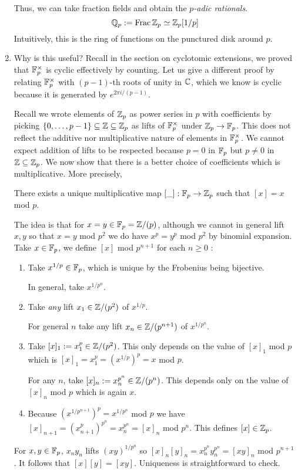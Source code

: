 \documentclass{article}
\begin{document}
\begin{enumerate}
  Thus, we can take fraction fields and obtain
  the \emph{$p$-adic rationals}.
  \[
    \mathbb{Q}_p := \mathrm{Frac}\,{\mathbb{Z}_p} \simeq \mathbb{Z}_p[1 / p]
  \]
  Intuitively, this is the ring of functions on the punctured disk around $p$.

  \item Why is this useful? 
  Recall in the section on cyclotomic extensions,
  we proved that $\mathbb{F}_p^\times$ is cyclic effectively by counting.
  Let us give a different proof by relating $\mathbb{F}_p^\times$
  with $(p-1)$-th roots of unity in $\mathbb{C}$, which we know is cyclic
  because it is generated by $e^{2 \pi i / (p - 1)}$.

  Recall we wrote elements of $\mathbb{Z}_p$ as 
  power series in $p$ with coefficients by picking
  $\left\{0 , \dots , p-1\right\} \subseteq \mathbb{Z} \subseteq \mathbb{Z}_p$ as lifts of $\mathbb{F}_p^\times$
  under $\mathbb{Z}_p \to \mathbb{F}_p$.
  This does not reflect the additive nor multiplicative
  nature of elements in $\mathbb{F}_p^\times$.
  We cannot expect addition of lifts to be respected because $p = 0$ in $\mathbb{F}_p$
  but $p \neq 0$ in $\mathbb{Z} \subseteq \mathbb{Z}_p$.
  We now show that there is a better choice of coefficients
  which is multiplicative.
  More precisely,
  \begin{lem}
    There exists a unique multiplicative map $[\_] : \mathbb{F}_p \to \mathbb{Z}_p$
    such that $[x] = x$ mod $p$.
   
    \begin{proof1}
      The idea is that for $x = y \in \mathbb{F}_p = \mathbb{Z} / (p)$,
      although we cannot in general lift $x , y$ so that
      $x = y$ mod $p^2$ we do have $x^p = y^p$ mod $p^2$ by binomial expansion.
      Take $x \in \mathbb{F}_p$,
      we define $[x]$ mod $p^{n+1}$ for each $n \geq 0$ : 
      \begin{enumerate}
        \item Take $x^{1 / p} \in \mathbb{F}_p$,
        which is unique by the Frobenius being bijective.

        In general, take $x^{1 / p^n}$.
        \item Take \emph{any} lift $x_1 \in \mathbb{Z} / (p^2)$ of $x^{1 / p}$.
        
        For general $n$ take any lift $x_n \in \mathbb{Z} / (p^{n+1})$
        of $x^{1 / p^n}$.
        \item Take $[x]_1 := x_1^p \in \mathbb{Z} / (p^2)$.
        This only depends on the value of $[x]_1$ mod $p$
        which is $[x]_1 = x_1^p = (x^{1 / p})^p = x$ mod $p$.

        For any $n$, take $[x]_n := x_n^{p^n} \in \mathbb{Z} / (p^n)$.
        This depends only on the value of $[x]_n$ mod $p$
        which is again $x$.
        \item Because $(x^{1 / p^{n+1}})^p = x^{1 / p^n}$ mod $p$
        we have $[x]_{n+1} = (x_{n+1}^p)^{p^n} = x_n^{p^n} = [x]_n$ mod $p^n$.
        This defines $[x] \in \mathbb{Z}_p$.
      \end{enumerate}
      For $x , y \in \mathbb{F}_p$,
      $x_n y_n$ lifts $(x y)^{1 / p^n}$ so 
      $[x]_n [y]_n = x_n^{p^n} y_n^{p^n} = [xy]_n$ mod $p^{n+1}$.
      It follows that $[x][y] = [x y]$.
      Uniqueness is straightforward to check.
    \end{proof1}
  \end{lem}


\end{enumerate}
\end{document}
